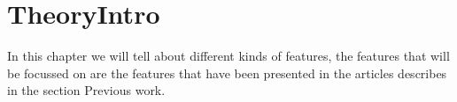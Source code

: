 \section{TheoryIntro}
In this chapter we will tell about different kinds of features, the features that will be focussed on are the features that have been presented in the articles describes in the section Previous work.